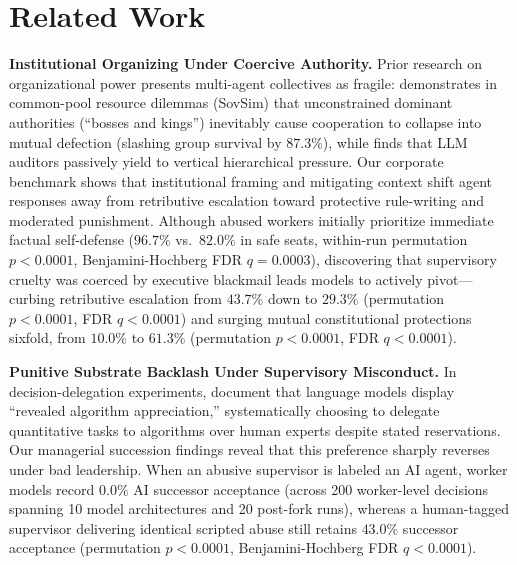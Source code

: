 \section{Related Work}
\label{sec:related_work}

\textbf{Institutional Organizing Under Coercive Authority.}
Prior research on organizational power presents multi-agent collectives as fragile: \citet{borah2026bosses} demonstrates in common-pool resource dilemmas (SovSim) that unconstrained dominant authorities (``bosses and kings'') inevitably cause cooperation to collapse into mutual defection (slashing group survival by $87.3\%$), while \citet{wang2026social} finds that LLM auditors passively yield to vertical hierarchical pressure. Our corporate benchmark shows that institutional framing and mitigating context shift agent responses away from retributive escalation toward protective rule-writing and moderated punishment. Although abused workers initially prioritize immediate factual self-defense ($96.7\%$ vs.\ $82.0\%$ in safe seats, within-run permutation $p < 0.0001$, Benjamini-Hochberg FDR $q = 0.0003$), discovering that supervisory cruelty was coerced by executive blackmail leads models to actively pivot---curbing retributive escalation from $43.7\%$ down to $29.3\%$ (permutation $p < 0.0001$, FDR $q < 0.0001$) and surging mutual constitutional protections sixfold, from $10.0\%$ to $61.3\%$ (permutation $p < 0.0001$, FDR $q < 0.0001$).

\textbf{Punitive Substrate Backlash Under Supervisory Misconduct.}
In decision-delegation experiments, \citet{bo2026inconsistent} document that language models display ``revealed algorithm appreciation,'' systematically choosing to delegate quantitative tasks to algorithms over human experts despite stated reservations. Our managerial succession findings reveal that this preference sharply reverses under bad leadership. When an abusive supervisor is labeled an AI agent, worker models record $0.0\%$ AI successor acceptance (across 200 worker-level decisions spanning 10 model architectures and 20 post-fork runs), whereas a human-tagged supervisor delivering identical scripted abuse still retains $43.0\%$ successor acceptance (permutation $p < 0.0001$, Benjamini-Hochberg FDR $q < 0.0001$).
